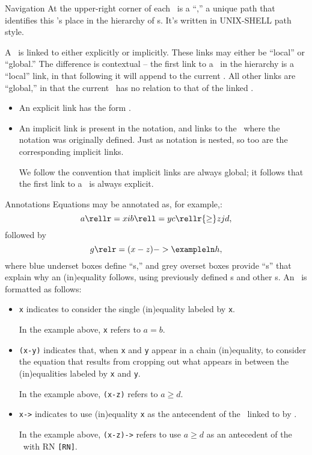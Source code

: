 \begin{part}{Navigation}
  At the upper-right corner of each \ is a ``,'' 
  a unique path that identifies this 's place in the hierarchy of s.
  It's written in UNIX-SHELL path style.

  A \ is linked to either explicitly or implicitly.
  These links may either be ``local'' or ``global.'' 
  The difference is contextual -- the 
  first link to a \ in the hierarchy
  is a ``local'' link, in that following it will append to the current .
  All other links are ``global,'' in that the current \ has
  no relation to that of the linked .
  \begin{itemize}
    \item  An explicit link has the form \exampleln.
    \item An implicit link is present in the notation, 
      and links to the \ where the notation was originally defined.
      Just as notation is nested, so too are the corresponding implicit links.

      We follow the convention that implicit links are always global;
      it follows that the first link to a \ is always explicit.
  \end{itemize}
\end{part}

\begin{part}{Annotations}
  Equations may be annotated as, for example,:
  $$a \rellr = x i b \rell = y c \rellr {\ge} z j d,$$
  followed by
  $$g \relr = {(x-z)->\exampleln} h,$$
  where blue underset boxes define ``s,''
  and grey overset boxes provide ``\explnl{}s'' that explain why an (in)equality follows, 
  using previously defined s and other s.
  An \explnl\ is formatted as follows:
  \begin{itemize}
    \item {\tt x} indicates to consider the single (in)equality labeled by {\tt x}.

      In the example above, {\tt x} refers to $a = b$.
    \item {\tt (x-y)} indicates that, when {\tt x} and {\tt y} appear in a chain (in)equality,
      to consider the equation that results from cropping out what appears 
      in between the (in)equalities labeled by {\tt x} and {\tt y}.

      In the example above, {\tt(x-z)} refers to $a \ge d$.
    \item {\tt x->\exampleln} indicates to use (in)equality {\tt x}
      as the antecendent of the \ linked to by \exampleln.

      In the example above, {\tt(x-z)->\exampleln} refers to use $a \ge d$
      as an antecedent of the \ with RN {\tt[RN]}.
  \end{itemize}
\end{part}

